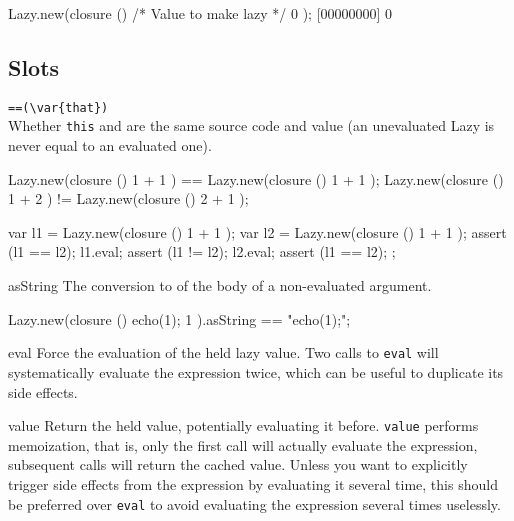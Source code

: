 \begin{urbiscript}
Lazy.new(closure () { /* Value to make lazy */ 0 });
[00000000] 0
\end{urbiscript}

\subsection{Slots}

\begin{urbiscriptapi}
\item \lstinline|==(\var{that})|\\
  Whether \lstinline|this| and  are the same source code and
  value (an unevaluated Lazy is never equal to an evaluated one).
\begin{urbiassert}
Lazy.new(closure () { 1 + 1 }) == Lazy.new(closure () { 1 + 1 });
Lazy.new(closure () { 1 + 2 }) != Lazy.new(closure () { 2 + 1 });
\end{urbiassert}
\begin{urbiscript}
{
  var l1 = Lazy.new(closure () { 1 + 1 });
  var l2 = Lazy.new(closure () { 1 + 1 });
  assert (l1 == l2);
  l1.eval;
  assert (l1 != l2);
  l2.eval;
  assert (l1 == l2);
};
\end{urbiscript}

\item[asString]
  The conversion to  of the body of a non-evaluated
  argument.
\begin{urbiassert}
Lazy.new(closure () { echo(1); 1 }).asString == "echo(1);";
\end{urbiassert}

\item[eval]
  Force the evaluation of the held lazy value. Two calls to
  \lstinline|eval| will systematically evaluate the expression twice,
  which can be useful to duplicate its side effects.

\item[value]
  Return the held value, potentially evaluating it
  before. \lstinline|value| performs memoization, that is, only the
  first call will actually evaluate the expression, subsequent calls
  will return the cached value. Unless you want to explicitly trigger
  side effects from the expression by evaluating it several time, this
  should be preferred over \lstinline|eval| to avoid evaluating the
  expression several times uselessly.
\end{urbiscriptapi}


